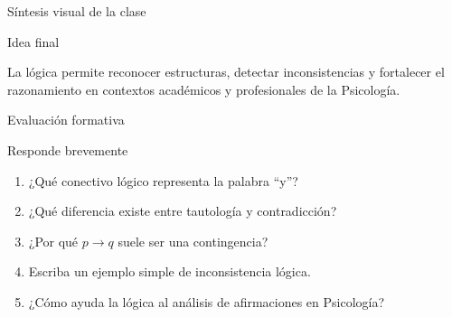 \documentclass[aspectratio=169,10pt,handout]{beamer}
\newenvironment{IdeaClave}[1]
{
	\begin{block}{#1}
		\justifying
	}
	{
	\end{block}
}
\begin{document}
	\begin{frame}{Síntesis visual de la clase}
		\begin{center}
		\end{center}
		
		\vspace{0.3cm}
		
		\begin{IdeaClave}{Idea final}
			La lógica permite reconocer estructuras, detectar inconsistencias y fortalecer el razonamiento en contextos académicos y profesionales de la Psicología.
		\end{IdeaClave}
	\end{frame}
	
	\begin{frame}{Evaluación formativa}
		\begin{IdeaClave}{Responde brevemente}
			\begin{enumerate}[leftmargin=*,label=\textbf{\arabic*.}]
				\item ¿Qué conectivo lógico representa la palabra ``y''?
				\item ¿Qué diferencia existe entre tautología y contradicción?
				\item ¿Por qué $p \to q$ suele ser una contingencia?
				\item Escriba un ejemplo simple de inconsistencia lógica.
				\item ¿Cómo ayuda la lógica al análisis de afirmaciones en Psicología?
			\end{enumerate}
		\end{IdeaClave}
	\end{frame}
	
\end{document}
